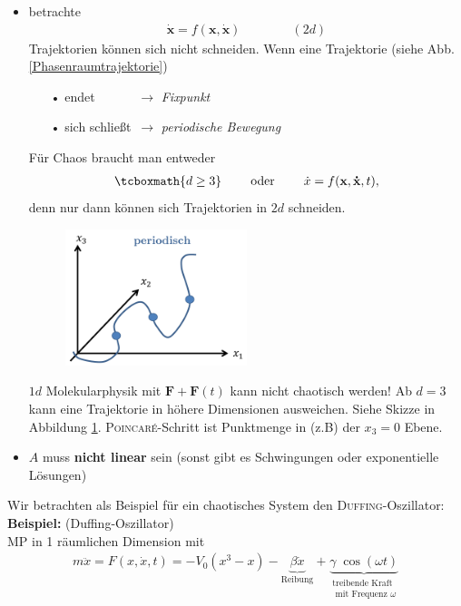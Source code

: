 \documentclass[12pt]{article}
\begin{document}
\begin{itemize}
\item betrachte  
\begin{align*}
\dot{\mathbf{x}} = f(\mathbf{x}, \mathbf{\dot{x}}) \qquad \qquad (2d)
\end{align*}
Trajektorien können sich nicht schneiden. Wenn eine Trajektorie (siehe Abb. \ref{Phasenraumtrajektorie})
\begin{itemize}
\item[•] endet $\qquad \quad \to$ \textit{Fixpunkt}
\item[•] sich schließt $\, \to$ \textit{periodische Bewegung}
\end{itemize} 
Für Chaos braucht man entweder 
\begin{align*}
\tcboxmath{ d \geq 3} \qquad \text{ oder } \qquad
\dot{x} = f(\mathbf{x}, \mathbf{\dot{x}},t),
\end{align*}
denn nur dann können sich Trajektorien in $2d$ schneiden. \\

\begin{figure}[ht]
\centering
\includegraphics[width=0.5\textwidth]{Folie67.png}
	\caption{}
	\label{fig:2d}
\end{figure}

$1d$ Molekularphysik mit $\mathbf{F} + \mathbf{F}(t)$ kann nicht chaotisch werden! Ab $d=3$ kann eine Trajektorie in höhere Dimensionen ausweichen. Siehe Skizze in Abbildung \ref{fig:2d}.
\textsc{Poincaré}-Schritt ist Punktmenge in (z.B) der $x_3 =0$ Ebene.

\item $A$ muss \textbf{nicht linear} sein (sonst gibt es Schwingungen oder exponentielle Lösungen)
\end{itemize}
Wir betrachten als Beispiel für ein chaotisches System den \textsc{Duffing}-Oszillator:
\textbf{Beispiel:} (Duffing-Oszillator) \\
MP in 1 räumlichen Dimension mit 
\begin{align*}
m \ddot{x} = F(x, \dot{x},t) = - V_0 (x^3 - x ) -\underbrace{ \beta \dot{x}}_\text{Reibung} + \underbrace{\gamma \; \cos (\omega t)}_{\substack{ \text{treibende Kraft} \\ \text{ mit Frequenz $\omega$}}}  
\end{align*}
\end{document}
